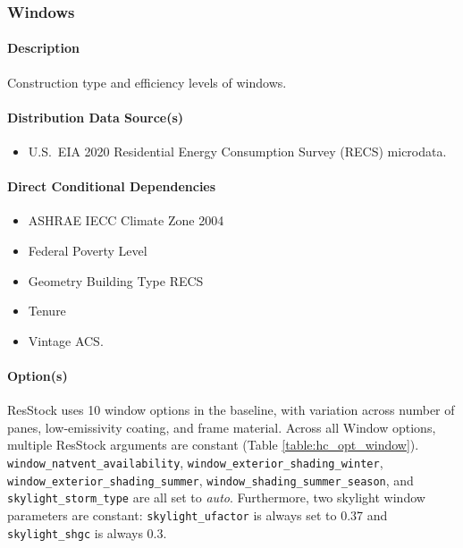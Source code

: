 \subsubsection{Windows}\label{windows}
\paragraph{Description}
Construction type and efficiency levels of windows.
\paragraph{Distribution Data Source(s)}
\begin{itemize}
 
\item
  U.S.~EIA 2020 Residential Energy Consumption Survey (RECS) microdata.
\end{itemize}

\paragraph{Direct Conditional Dependencies}

\begin{itemize}
    \item ASHRAE IECC Climate Zone 2004
    \item Federal Poverty Level
    \item Geometry Building Type RECS
    \item Tenure
    \item Vintage ACS.
\end{itemize}

\paragraph{Option(s)}
ResStock uses 10 window options in the baseline, with variation across number of panes, low-emissivity coating, and frame material. Across all Window options, multiple ResStock arguments are constant (Table \ref{table:hc_opt_window}). \texttt{window\_natvent\_availability},
\texttt{window\_exterior\_shading\_winter}, 
\texttt{window\_exterior\_shading\_summer}, 
\texttt{window\_shading\_summer\_season}, and 
\texttt{skylight\_storm\_type} are all set to \textit{auto}. Furthermore, two skylight window parameters are constant: 
\texttt{skylight\_ufactor} is always set to 0.37
and \texttt{skylight\_shgc} is always 0.3.

